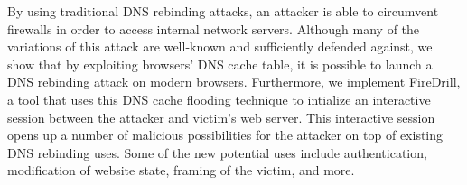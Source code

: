By using traditional DNS rebinding attacks, an attacker is able to circumvent firewalls in order to access internal network servers. Although many of the variations of this attack are well-known and sufficiently defended against, we show that by exploiting browsers' DNS cache table, it is possible to launch a DNS rebinding attack on modern browsers. Furthermore, we implement FireDrill, a tool that uses this DNS cache flooding technique to intialize an interactive session between the attacker and victim's web server. This interactive session opens up a number of malicious possibilities for the attacker on top of existing DNS rebinding uses. Some of the new potential uses include authentication, modification of website state, framing of the victim, and more.
